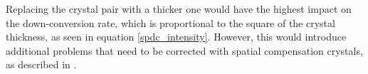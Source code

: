 \documentclass[a4paper,
DIV=13,
12pt,
BCOR=10mm,
department=FakEI,
twoside,
parskip=half,
automark,
logostyle=flat,
]{OTHRartcl}
\begin{document}
Replacing the crystal pair with a thicker one would have the highest impact on the down-conversion rate, which is proportional to the square of the crystal thickness, as seen in equation \eqref{spdc_intensity}. However, this would introduce additional problems that need to be corrected with spatial compensation crystals, as described in \cite{thorlabs_manual}.






\cleardoublepage
\appendix
\listoffigures

\clearpage




\clearpage
\makedeclaration
\end{document}
